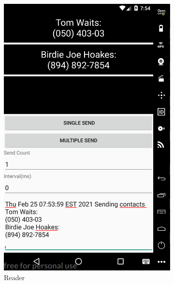 \begin{figure}[h!]
	\begin{subfigure}[h]{0.5\textwidth}
	\centering
	\includegraphics[height=0.5\textheight]{graphics/Reader}
	\caption{Reader}
	\label{fig:readerGUI}
	\end{subfigure}
\hfill	
	\begin{subfigure}[h]{0.5\textwidth}
	\centering

\end{subfigure}
\end{figure}

